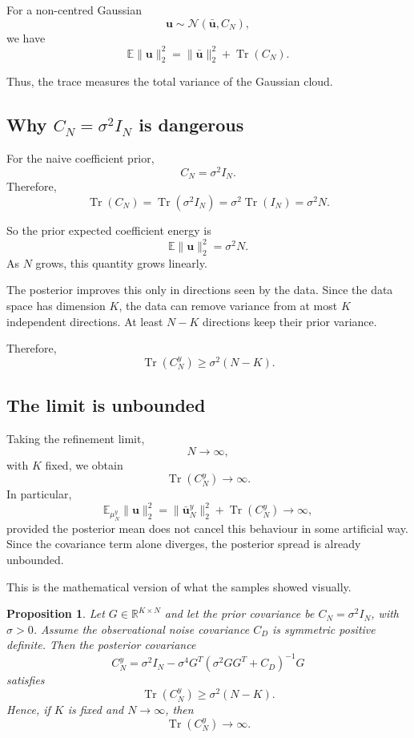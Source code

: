 \documentclass[11pt,a4paper]{book}
\newtheorem{proposition}[definition]{Proposition}
\newcommand{\post}{\mu^y}
\begin{document}
For a non-centred Gaussian
\[
    \bm{u} \sim \mathcal{N}(\bar{\bm{u}},C_N),
\]
we have
\[
    \mathbb{E}\|\bm{u}\|_2^2
    =
    \|\bar{\bm{u}}\|_2^2
    +
    \operatorname{Tr}(C_N).
\]

Thus, the trace measures the total variance of the Gaussian cloud.

\subsection{Why $C_N = \sigma^2 I_N$ is dangerous}

For the naive coefficient prior,
\[
    C_N = \sigma^2 I_N.
\]
Therefore,
\[
    \operatorname{Tr}(C_N)
    =
    \operatorname{Tr}(\sigma^2 I_N)
    =
    \sigma^2\operatorname{Tr}(I_N)
    =
    \sigma^2 N.
\]

So the prior expected coefficient energy is
\[
    \mathbb{E}\|\bm{u}\|_2^2
    =
    \sigma^2 N.
\]
As $N$ grows, this quantity grows linearly.

The posterior improves this only in directions seen by the data. Since the data
space has dimension $K$, the data can remove variance from at most $K$
independent directions. At least $N-K$ directions keep their prior variance.

Therefore,
\[
    \operatorname{Tr}(C_N^y)
    \geq
    \sigma^2(N-K).
\]

\subsection{The limit is unbounded}

Taking the refinement limit,
\[
    N \to \infty,
\]
with $K$ fixed, we obtain
\[
    \operatorname{Tr}(C_N^y)
    \to
    \infty.
\]
In particular,
\[
    \mathbb{E}_{\post_N}
    \|\bm{u}\|_2^2
    =
    \|\bar{\bm{u}}_N^y\|_2^2
    +
    \operatorname{Tr}(C_N^y)
    \to
    \infty,
\]
provided the posterior mean does not cancel this behaviour in some artificial
way. Since the covariance term alone diverges, the posterior spread is already
unbounded.

This is the mathematical version of what the samples showed visually.

\begin{proposition}
Let $G\in\mathbb{R}^{K\times N}$ and let the prior covariance be
$C_N=\sigma^2 I_N$, with $\sigma>0$. Assume the observational noise covariance
$C_D$ is symmetric positive definite. Then the posterior covariance
\[
    C_N^y
    =
    \sigma^2 I_N
    -
    \sigma^4 G^T
    \left(
        \sigma^2 GG^T + C_D
    \right)^{-1}
    G
\]
satisfies
\[
    \operatorname{Tr}(C_N^y)
    \geq
    \sigma^2(N-K).
\]
Hence, if $K$ is fixed and $N\to\infty$, then
\[
    \operatorname{Tr}(C_N^y)\to\infty.
\]
\end{proposition}
\end{document}
